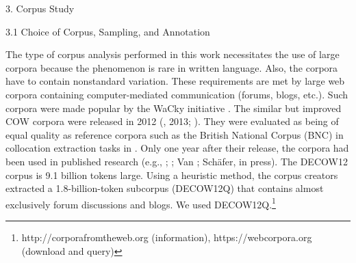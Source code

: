 \begin{styleMoutonHeadingi}
3.  Corpus Study
\end{styleMoutonHeadingi}

\begin{styleMoutonHeadingii}
3.1  Choice of Corpus, Sampling, and Annotation
\end{styleMoutonHeadingii}

\begin{styleMoutonText}
The type of corpus analysis performed in this work necessitates the use of large corpora because the phenomenon is rare in written language. Also, the corpora have to contain nonstandard variation. These re\-quirements are met by large web corpora containing computer-medi\-ated communication (forums, blogs, etc.). Such corpora were made popular by the WaCky initiative \citep{BaroniEtAl2009}. The similar but improved COW corpora were released in 2012 (\citealt{SchäferBildhauer2012}, 2013; \citealt{SchäferEtAl2013}). They were evaluated as being of equal quality as reference corpora such as the British National Corpus (BNC) in collocation extraction tasks in \citet{BiemannEtAl2013}. Only one year after their release, the corpora had been used in published research (e.g., \citealt{Müller2014}; \citealt{SchäferSayatz2014}; Van \citealt{GoethemHiligsmann2014}; Schäfer, in press). The DECOW12 corpus is 9.1 billion tokens large. Using a heuristic method, the corpus creators extracted a 1.8-billion-to\-ken subcorpus (DECOW12Q) that contains almost exclusively forum discussions and blogs. We used DECOW12Q.\footnote{http://corporafromtheweb.org (information), https://webcorpora.org (download and query)}
\end{styleMoutonText}

